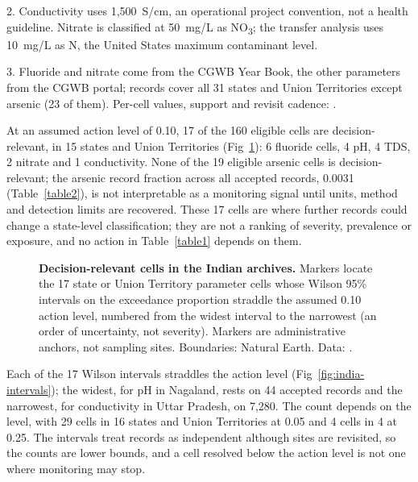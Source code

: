 \documentclass[10pt,letterpaper]{article}
\begin{document}
\begin{table}[!ht]
{\begin{flushleft}
2. Conductivity uses 1,500~\textmu{}S/cm, an operational project convention, not a health guideline. Nitrate is classified at 50~mg/L as NO\textsubscript{3}; the transfer analysis uses 10~mg/L as N, the United States maximum contaminant level.

3. Fluoride and nitrate come from the CGWB Year Book, the other parameters from the CGWB portal; records cover all 31 states and Union Territories except arsenic (23 of them). Per-cell values, support and revisit cadence: .
\end{flushleft}
}
\label{table2}
\end{table}

At an assumed action level of 0.10, 17 of the 160 eligible cells are decision-relevant, in 15 states and Union Territories (Fig~\ref{fig:india-map}): 6 fluoride cells, 4 pH, 4 TDS, 2 nitrate and 1 conductivity. None of the 19 eligible arsenic cells is decision-relevant; the arsenic record fraction across all accepted records, 0.0031 (Table~\ref{table2}), is not interpretable as a monitoring signal until units, method and detection limits are recovered. These 17 cells are where further records could change a state-level classification; they are not a ranking of severity, prevalence or exposure, and no action in Table~\ref{table1} depends on them.\label{callout:fig:india-map}

\begin{figure}[!ht]
\caption{\textbf{Decision-relevant cells in the Indian archives.} Markers locate the 17 state or Union Territory \texttimes{} parameter cells whose Wilson 95\% intervals on the exceedance proportion straddle the assumed 0.10 action level, numbered from the widest interval to the narrowest (an order of uncertainty, not severity). Markers are administrative anchors, not sampling sites. Boundaries: Natural Earth. Data: .}
\label{fig:india-map}
\end{figure}

Each of the 17 Wilson intervals straddles the action level (Fig~\ref{fig:india-intervals}); the widest, for pH in Nagaland, rests on 44 accepted records and the narrowest, for conductivity in Uttar Pradesh, on 7,280. The count depends on the level, with 29 cells in 16 states and Union Territories at 0.05 and 4 cells in 4 at 0.25. The intervals treat records as independent although sites are revisited, so the counts are lower bounds, and a cell resolved below the action level is not one where monitoring may stop.\label{callout:fig:india-intervals}
\end{document}
